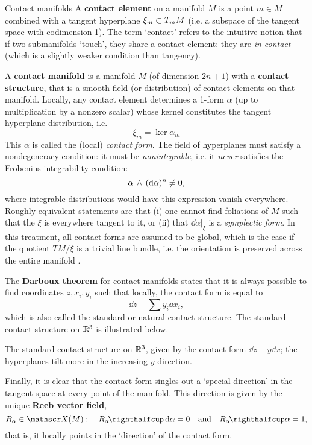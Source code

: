 \begin{mathbox}{Contact manifolds}
    A \textbf{contact element} on a manifold $M$ is a point $m \in M$ combined with a tangent hyperplane $\xi_m \subset T_mM$ (i.e. a subspace of the tangent space  with codimension 1). The term `contact' refers to the intuitive notion that if two submanifolds `touch', they share a contact element: they are \emph{in contact} (which is a slightly weaker condition than tangency). \cite{Cannas2001}

    A \textbf{contact manifold} is a manifold $M$ (of dimension $2n+1$) with a \textbf{contact structure}, that is a smooth field (or distribution) of contact elements on that manifold. Locally, any contact element determines a 1-form $\alpha$ (up to multiplication by a nonzero scalar) whose kernel constitutes the tangent hyperplane distribution, i.e. 
    $$ \xi_m = \ker \alpha_m $$
    This $\alpha$ is called the (local) \emph{contact form}. The field of hyperplanes must satisfy a nondegeneracy condition: it must be \emph{nonintegrable}, i.e. it \emph{never} satisfies the Frobenius integrability condition: \cite{Cannas2001,Abraham1978,Arnold1989}
    $$  \alpha\,\wedge\,(\dd{\alpha})^n  \neq 0, $$
    where integrable distributions would have this expression vanish everywhere. Roughly equivalent statements are that (i) one cannot find foliations of $M$ such that the $\xi$ is everywhere tangent to it, or (ii) that $\dd{\alpha}\vert_\xi$ is a \emph{symplectic form}. In this treatment, all contact forms are assumed to be global, which is the case if the quotient $TM/\xi$ is a trivial line bundle, i.e. the orientation is preserved across the entire manifold \cite{Geiges2008}.

    \tcblower
    The \textbf{Darboux theorem} for contact manifolds states that it is always possible to find coordinates $z, x_i, y_i$ such that locally, the contact form is equal to 
    $$ \dd{z} - \sum y_i\dd{x_i}, $$
    which is also called the standard or natural contact structure. The standard contact structure on $\mathbb{R}^3$ is illustrated below.
        \begin{center}
            
        \end{center}
        \begin{center}
            \begin{minipage}{12cm}
                {\small The standard contact structure on $\mathbb{R}^3$, given by the contact form $\dd{z} - y\dd{x}$; the hyperplanes tilt more in the increasing $y$-direction.}
            \end{minipage}
        \end{center}
    Finally, it is clear that the contact form singles out a `special direction' in the tangent space at every point of the manifold. This direction is given by the unique \textbf{Reeb vector field},
    $$ R_\alpha \in \vfields{M}:\quad \intpr{R_\alpha}{\dd{\alpha}}= 0 \quad \text{and} \quad \intpr{R_\alpha}{\alpha} = 1,$$
    that is, it locally points in the `direction' of the contact form.
\end{mathbox}

